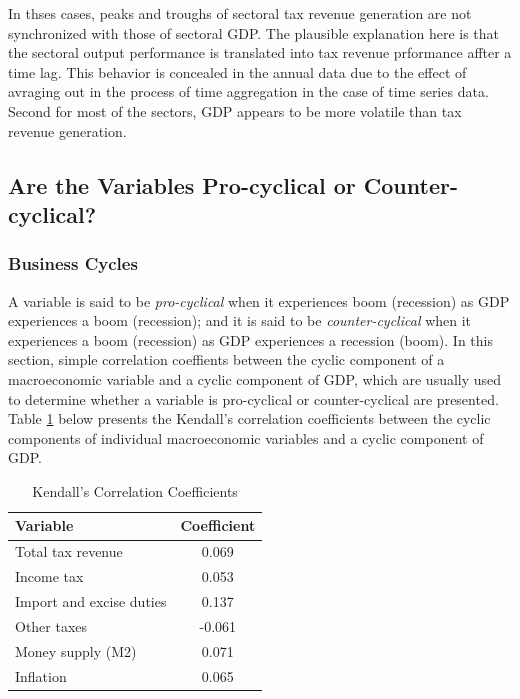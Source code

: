 \documentclass[12pt,a4paper,final]{article}
\begin{document}
In thses cases, peaks and troughs of sectoral tax revenue generation are not synchronized with those of sectoral GDP. The plausible explanation here is that the sectoral output performance is translated into tax revenue prformance affter a time lag. This behavior is concealed in the annual data due to the effect of avraging out in the process of time aggregation in the case of time series data. Second for most of the sectors, GDP appears to be more volatile than tax revenue generation.
\subsection{Are the Variables Pro-cyclical or Counter-cyclical?}

\subsubsection{Business Cycles}

A variable is said to be \textit{pro-cyclical} when it experiences boom (recession) as GDP experiences a boom (recession); and it is said to be \textit{counter-cyclical} when it experiences a boom (recession) as GDP experiences a recession (boom). In this section, simple correlation coeffients between the cyclic component of a macroeconomic variable and a cyclic component of GDP, which are usually used to determine whether a variable is pro-cyclical or counter-cyclical are presented.  Table \ref{tab2} below presents the Kendall's correlation coefficients between the cyclic components of individual macroeconomic variables and a cyclic component of GDP.


\begin{table}[h]
\centering
\begin{small} 
\caption{Kendall's Correlation Coefficients} 
\label{tab2}
\begin{tabular}{l c }
\toprule
\multicolumn{1}{l}{\textbf{Variable}} & \textbf{Coefficient}\\ 
 \midrule
Total tax revenue & 0.069 \\
Income tax & 0.053 \\
Import and excise duties & 0.137\\
Other taxes  & -0.061\\
Money supply (M2) & 0.071 \\
Inflation & 0.065\\
\bottomrule
\end{tabular}
\end{small}
\end{table}
 
\end{document}
